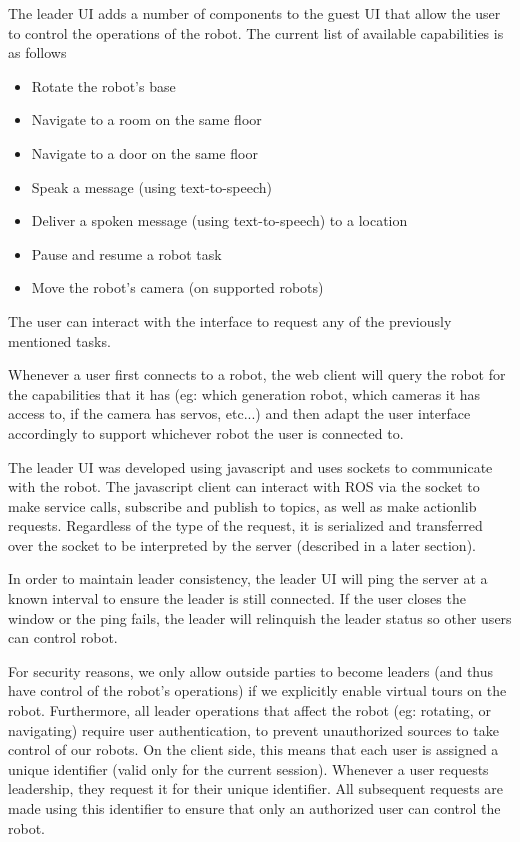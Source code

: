 \documentclass{sig-alternate-05-2015}
\begin{document}
The leader UI adds a number of components to the guest UI that allow the user to
control the operations of the robot. The current list of available capabilities
is as follows

\begin{itemize}
  \item Rotate the robot's base
  \item Navigate to a room on the same floor
  \item Navigate to a door on the same floor
  \item Speak a message (using text-to-speech)
  \item Deliver a spoken message (using text-to-speech) to a location
  \item Pause and resume a robot task
  \item Move the robot's camera (on supported robots)
\end{itemize}

The user can interact with the interface to request any of the previously
mentioned tasks.

Whenever a user first connects to a robot, the web client will query the robot
for the capabilities that it has (eg: which generation robot, which cameras it
has access to, if the camera has servos, etc...) and then adapt the user
interface accordingly to support whichever robot the user is connected to.

The leader UI was developed using javascript and uses sockets to
communicate with the robot. The javascript client can interact with ROS via the
socket to make service calls, subscribe and publish to topics, as well as make
actionlib requests. Regardless of the type of the request, it is serialized and
transferred over the socket to be interpreted by the server (described in a
later section).

In order to maintain leader consistency, the leader UI will ping the server at
a known interval to ensure the leader is still connected. If the user closes
the window or the ping fails, the leader will relinquish the leader status so
other users can control robot.

For security reasons, we only allow outside parties to become leaders (and thus
have control of the robot's operations) if we explicitly enable virtual tours
on the robot. Furthermore, all leader operations that affect the robot (eg:
rotating, or navigating) require user authentication, to prevent unauthorized
sources to take control of our robots. On the client side, this means that each
user is assigned a unique identifier (valid only for the current session).
Whenever a user requests leadership, they request it for their unique
identifier. All subsequent requests are made using this identifier to ensure
that only an authorized user can control the robot.
\end{document}
